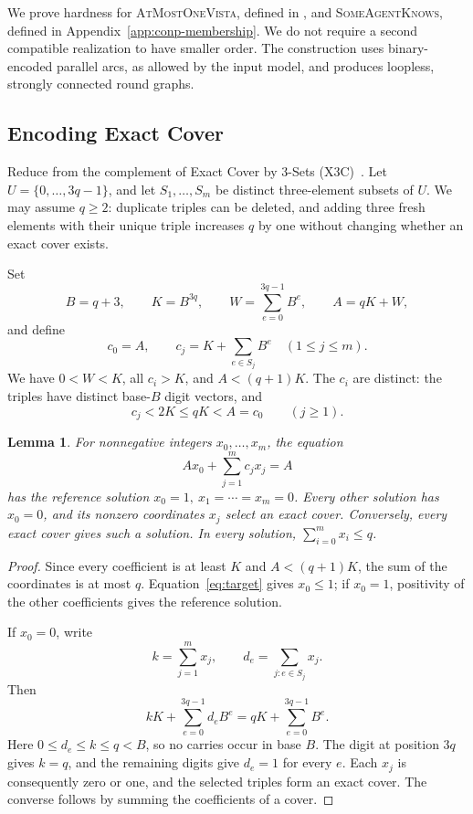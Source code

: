 \documentclass[11pt]{article}
\newtheorem{lemma}{Lemma}
\begin{document}
We prove hardness for \textsc{AtMostOneVista}, defined in
, and \textsc{SomeAgentKnows},
defined in Appendix~\ref{app:conp-membership}.
We do not require a second compatible realization to have smaller order.
The construction uses binary-encoded parallel arcs, as allowed by the
input model, and produces loopless, strongly connected round graphs.

\subsection{Encoding Exact Cover}

Reduce from the complement of Exact Cover by 3-Sets
(\textsc{X3C})~\cite[Problem~SP2]{GJ79}.
Let \(U=\{0,\ldots,3q-1\}\), and let \(S_1,\ldots,S_m\) be distinct
three-element subsets of \(U\).
We may assume \(q\geq2\): duplicate triples can be deleted, and adding
three fresh elements with their unique triple increases \(q\) by one
without changing whether an exact cover exists.

Set
\[
 B=q+3,\qquad K=B^{3q},\qquad
 W=\sum_{e=0}^{3q-1}B^e,\qquad A=qK+W,
\]
and define
\[
 c_0=A,\qquad
 c_j=K+\sum_{e\in S_j}B^e\quad(1\leq j\leq m).
\]
We have \(0<W<K\), all \(c_i>K\), and \(A<(q+1)K\).
The \(c_i\) are distinct: the triples have distinct base-\(B\) digit
vectors, and
\[
 c_j<2K\leq qK<A=c_0 \qquad (j\geq1).
\]

\begin{lemma}
\label{lem:conp-digits}
For nonnegative integers \(x_0,\ldots,x_m\), the equation
\begin{equation}
 A x_0+\sum_{j=1}^m c_jx_j=A
 \label{eq:target}
\end{equation}
has the reference solution \(x_0=1,\ x_1=\cdots=x_m=0\).
Every other solution has \(x_0=0\), and its nonzero coordinates
\(x_j\) select an exact cover. Conversely, every exact cover gives
such a solution. In every solution,
\(\sum_{i=0}^m x_i\leq q\).
\end{lemma}

\begin{proof}
Since every coefficient is at least \(K\) and \(A<(q+1)K\),
the sum of the coordinates is at most \(q\).
Equation~\eqref{eq:target} gives \(x_0\leq1\); if \(x_0=1\),
positivity of the other coefficients gives the reference solution.

If \(x_0=0\), write
\[
 k=\sum_{j=1}^m x_j,\qquad
 d_e=\sum_{j:e\in S_j}x_j.
\]
Then
\[
 kK+\sum_{e=0}^{3q-1}d_e B^e
   =qK+\sum_{e=0}^{3q-1}B^e.
\]
Here \(0\leq d_e\leq k\leq q<B\), so no carries occur in base \(B\).
The digit at position \(3q\) gives \(k=q\), and the remaining digits
give \(d_e=1\) for every \(e\). Each \(x_j\) is consequently zero or
one, and the selected triples form an exact cover. The converse
follows by summing the coefficients of a cover.
\end{proof}
\end{document}
